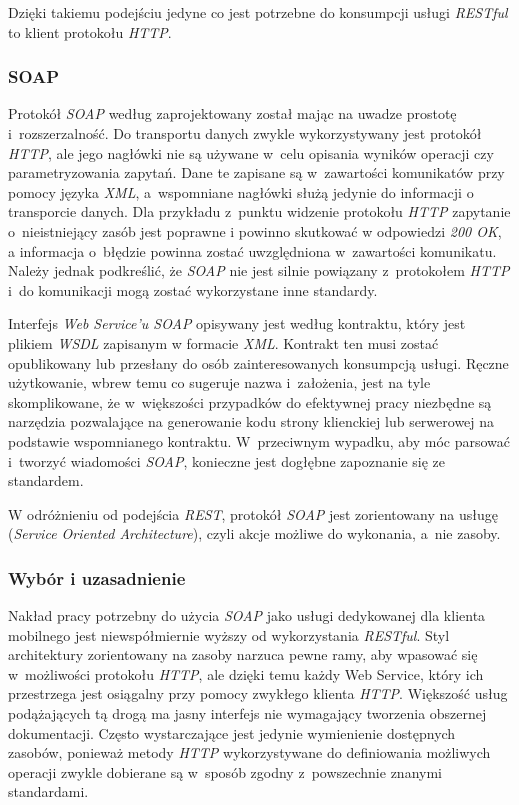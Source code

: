 \documentclass[11pt]{aghdpl}
\begin{document}
Dzięki takiemu podejściu jedyne co jest potrzebne do konsumpcji usługi \emph{RESTful} to klient protokołu \emph{HTTP}.

\subsubsection{SOAP}

Protokół \emph{SOAP} według \cite{W3Soap} zaprojektowany został mając na uwadze prostotę i~rozszerzalność. Do transportu danych zwykle wykorzystywany jest protokół \emph{HTTP}, ale jego nagłówki nie są używane w~celu opisania wyników operacji czy parametryzowania zapytań. Dane te zapisane są w~zawartości komunikatów przy pomocy języka \emph{XML}, a~wspomniane nagłówki służą jedynie do informacji o transporcie danych. Dla przykładu z~punktu widzenie protokołu \emph{HTTP} zapytanie o~nieistniejący zasób jest poprawne i powinno skutkować w odpowiedzi \emph{200 OK}, a informacja o~błędzie powinna zostać uwzględniona w~zawartości komunikatu. Należy jednak podkreślić, że \emph{SOAP} nie jest silnie powiązany z~protokołem \emph{HTTP} i~do komunikacji mogą zostać wykorzystane inne standardy.

Interfejs \emph{Web Service'u SOAP} opisywany jest według kontraktu, który jest plikiem \emph{WSDL} zapisanym w formacie \emph{XML}. Kontrakt ten musi zostać opublikowany lub przesłany do osób zainteresowanych konsumpcją usługi. Ręczne użytkowanie, wbrew temu co sugeruje nazwa i~założenia, jest na tyle skomplikowane, że w~większości przypadków do efektywnej pracy niezbędne są narzędzia pozwalające na generowanie kodu strony klienckiej lub serwerowej na podstawie wspomnianego kontraktu. W~przeciwnym wypadku, aby móc parsować i~tworzyć wiadomości \emph{SOAP}, konieczne jest dogłębne zapoznanie się ze standardem.

W odróżnieniu od podejścia \emph{REST}, protokół \emph{SOAP} jest zorientowany na usługę (\emph{Service Oriented Architecture}), czyli akcje możliwe do wykonania, a~nie zasoby.

\subsubsection{Wybór i uzasadnienie}

Nakład pracy potrzebny do użycia \emph{SOAP} jako usługi dedykowanej dla klienta mobilnego jest niewspółmiernie wyższy od wykorzystania \emph{RESTful}. Styl architektury zorientowany na zasoby narzuca pewne ramy, aby wpasować się w~możliwości protokołu \emph{HTTP}, ale dzięki temu każdy Web Service, który ich przestrzega jest osiągalny przy pomocy zwykłego klienta \emph{HTTP}. Większość usług podążających tą drogą ma jasny interfejs nie wymagający tworzenia obszernej dokumentacji. Często wystarczające jest jedynie wymienienie dostępnych zasobów, ponieważ metody \emph{HTTP} wykorzystywane do definiowania możliwych operacji zwykle dobierane są w~sposób zgodny z~powszechnie znanymi standardami.
\end{document}
